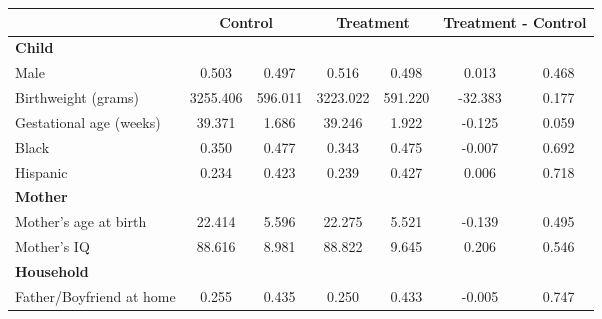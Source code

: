 \begin{tabular}{lcccccc}
\toprule
& \multicolumn{2}{c}{Control} & \multicolumn{2}{c}{Treatment} & \multicolumn{2}{c}{Treatment - Control} \\
\midrule
\textbf{Child} & & & & & & \\
\quad\quad Male & 0.503 & 0.497 & 0.516 & 0.498 & 0.013 & 0.468 \\
\quad\quad Birthweight (grams) & 3255.406 & 596.011 & 3223.022 & 591.220 & -32.383 & 0.177 \\
\quad\quad Gestational age (weeks) & 39.371 & 1.686 & 39.246 & 1.922 & -0.125 & 0.059 \\
\quad\quad Black & 0.350 & 0.477 & 0.343 & 0.475 & -0.007 & 0.692 \\
\quad\quad Hispanic & 0.234 & 0.423 & 0.239 & 0.427 & 0.006 & 0.718 \\
\textbf{Mother} & & & & & & \\
\quad\quad Mother's age at birth & 22.414 & 5.596 & 22.275 & 5.521 & -0.139 & 0.495 \\
\quad\quad Mother's IQ & 88.616 & 8.981 & 88.822 & 9.645 & 0.206 & 0.546 \\
\textbf{Household} & & & & & & \\
\quad\quad Father/Boyfriend at home & 0.255 & 0.435 & 0.250 & 0.433 & -0.005 & 0.747 \\
\bottomrule
\end{tabular}
